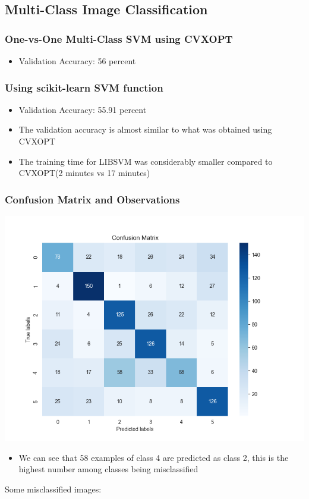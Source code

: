 \documentclass[12pt,a4paper]{article}
\begin{document}
\subsection{Multi-Class Image Classification}
\subsubsection{One-vs-One Multi-Class SVM using CVXOPT}
\begin{itemize}
    \item Validation Accuracy: 56 percent
\end{itemize}

\subsubsection{Using scikit-learn SVM function}
\begin{itemize}
    \item Validation Accuracy: 55.91 percent
    \item The validation accuracy is almost similar to what was obtained using CVXOPT
    \item The training time for LIBSVM was considerably smaller compared to CVXOPT(2 minutes vs 17 minutes)
\end{itemize}

\subsubsection{Confusion Matrix and Observations}
\includegraphics[width=\textwidth]{Assignment 2/q2/confusion_matrix libsvm.png}
\begin{itemize}
    \item We can see that 58 examples of class 4 are predicted as class 2, this is the highest number among classes being misclassified
\end{itemize}
Some misclassified images:
\end{document}

